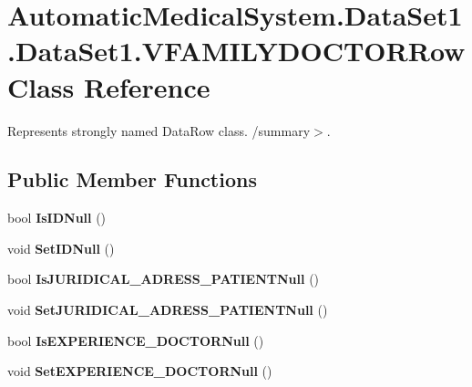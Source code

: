 \section{AutomaticMedicalSystem.DataSet1.DataSet1.VFAMILYDOCTORRow Class Reference}
\label{class_automatic_medical_system_1_1_data_set1_1_1_v_f_a_m_i_l_y_d_o_c_t_o_r_row}
Represents strongly named DataRow class. /summary$>$.  


\subsection*{Public Member Functions}
\begin{CompactItemize}
\item 
bool \textbf{IsIDNull} ()\label{class_automatic_medical_system_1_1_data_set1_1_1_v_f_a_m_i_l_y_d_o_c_t_o_r_row_dc8fe654c36d8bb9269e84bc49518f82}

\item 
void \textbf{SetIDNull} ()\label{class_automatic_medical_system_1_1_data_set1_1_1_v_f_a_m_i_l_y_d_o_c_t_o_r_row_23d942e380490cd4895f5771d43700bc}

\item 
bool \textbf{IsJURIDICAL\_\-ADRESS\_\-PATIENTNull} ()\label{class_automatic_medical_system_1_1_data_set1_1_1_v_f_a_m_i_l_y_d_o_c_t_o_r_row_e33e6f59dcacc6631716879bc67a741e}

\item 
void \textbf{SetJURIDICAL\_\-ADRESS\_\-PATIENTNull} ()\label{class_automatic_medical_system_1_1_data_set1_1_1_v_f_a_m_i_l_y_d_o_c_t_o_r_row_e53a348a2adabfa5fbaaebb386370f24}

\item 
bool \textbf{IsEXPERIENCE\_\-DOCTORNull} ()\label{class_automatic_medical_system_1_1_data_set1_1_1_v_f_a_m_i_l_y_d_o_c_t_o_r_row_8f65334c973bad1fb085537d6e1a413d}

\item 
void \textbf{SetEXPERIENCE\_\-DOCTORNull} ()\label{class_automatic_medical_system_1_1_data_set1_1_1_v_f_a_m_i_l_y_d_o_c_t_o_r_row_1b13e8107beb53c6338dba4afb8a91d2}

\end{CompactItemize}
